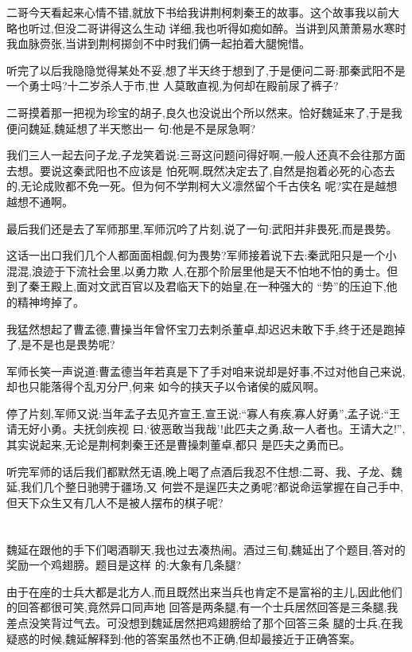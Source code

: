 ﻿\documentclass[12pt,twocolumn]{article}
\begin{document}
二哥今天看起来心情不错,就放下书给我讲荆柯刺秦王的故事。这个故事我以前大略也听过,但没二哥讲得这么生动
详细,我也听得如痴如醉。当讲到风萧萧易水寒时我血脉赍张,当讲到荆柯掷剑不中时我们俩一起拍着大腿惋惜。

听完了以后我隐隐觉得某处不妥,想了半天终于想到了,于是便问二哥:那秦武阳不是一个勇士吗?十二岁杀人于市,世
人莫敢直视,为何却在殿前尿了裤子?

二哥摸着那一把视为珍宝的胡子,良久也没说出个所以然来。恰好魏延来了,于是我便问魏延,魏延想了半天憋出一
句:他是不是尿急啊?

我们三人一起去问子龙,子龙笑着说:三哥这问题问得好啊,一般人还真不会往那方面去想。要说这秦武阳也不应该是
怕死啊,既然决定去了,自然是抱着必死的心态去的,无论成败都不免一死。但为何不学荆柯大义凛然留个千古侠名
呢?实在是越想越想不通啊。

最后我们还是去了军师那里,军师沉吟了片刻,说了一句:武阳并非畏死,而是畏势。

这话一出口我们几个人都面面相觑,何为畏势?军师接着说下去:秦武阳只是一个小混混,浪迹于下流社会里,以勇力欺
人,在那个阶层里他是天不怕地不怕的勇士。但到了秦王殿上,面对文武百官以及君临天下的始皇,在一种强大的
``势''的压迫下,他的精神垮掉了。

我猛然想起了曹孟德,曹操当年曾怀宝刀去刺杀董卓,却迟迟未敢下手,终于还是跑掉了,是不是也是畏势呢?

军师长笑一声说道:曹孟德当年若真是下了手对咱来说却是好事,不过对他自己来说,却也只能落得个乱刃分尸,何来
如今的挟天子以令诸侯的威风啊。

停了片刻,军师又说:当年孟子去见齐宣王,宣王说:``寡人有疾,寡人好勇'',孟子说:``王请无好小勇。夫抚剑疾视
曰,‘彼恶敢当我哉’!此匹夫之勇,敌一人者也。王请大之!'',其实说起来,无论是荆柯刺秦王还是曹操刺董卓,都只
是匹夫之勇而已。

听完军师的话后我们都默然无语,晚上喝了点酒后我忍不住想:二哥、我、子龙、魏延,我们几个整日驰骋于疆场,又
何尝不是逞匹夫之勇呢?都说命运掌握在自己手中,但天下众生又有几人不是被人摆布的棋子呢?

\section{}

魏延在跟他的手下们喝酒聊天,我也过去凑热闹。酒过三旬,魏延出了个题目,答对的奖励一个鸡翅膀。题目是这样
的:大象有几条腿?

由于在座的士兵大都是北方人,而且既然出来当兵也肯定不是富裕的主儿,因此他们的回答都很可笑,竟然异口同声地
回答是两条腿,有一个士兵居然回答是三条腿,我差点没笑背过气去。可没想到魏延居然把鸡翅膀给了那个回答三条
腿的士兵,在我疑惑的时候,魏延解释到:他的答案虽然也不正确,但却最接近于正确答案。
\end{document}
